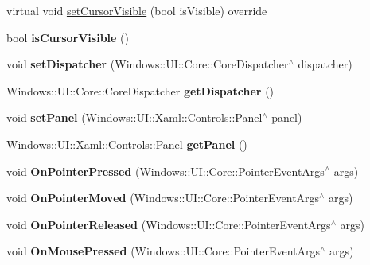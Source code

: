 \begin{DoxyCompactItemize}
virtual void \hyperlink{classGLViewImpl_a7e609efc4d34d98544b42e5f18ff29b8}{set\+Cursor\+Visible} (bool is\+Visible) override
\item 
\mbox{\label{classGLViewImpl_a522924b9888525f2cbd4929f684889f4}} 
bool {\bfseries is\+Cursor\+Visible} ()
\item 
\mbox{\label{classGLViewImpl_abeef623c7af0f597eef89c7e977df9e4}} 
void {\bfseries set\+Dispatcher} (Windows\+::\+U\+I\+::\+Core\+::\+Core\+Dispatcher$^\wedge$ dispatcher)
\item 
\mbox{\label{classGLViewImpl_a0e28b443b9abbc36e8ebfabcb7e91e63}} 
Windows\+::\+U\+I\+::\+Core\+::\+Core\+Dispatcher {\bfseries get\+Dispatcher} ()
\item 
\mbox{\label{classGLViewImpl_ad054c230517842fe38d583f34e207083}} 
void {\bfseries set\+Panel} (Windows\+::\+U\+I\+::\+Xaml\+::\+Controls\+::\+Panel$^\wedge$ panel)
\item 
\mbox{\label{classGLViewImpl_a73499a0c3442ea748c0bec971f5f2edf}} 
Windows\+::\+U\+I\+::\+Xaml\+::\+Controls\+::\+Panel {\bfseries get\+Panel} ()
\item 
\mbox{\label{classGLViewImpl_a3fcd4cc624abb75d010920e762ab9d42}} 
void {\bfseries On\+Pointer\+Pressed} (Windows\+::\+U\+I\+::\+Core\+::\+Pointer\+Event\+Args$^\wedge$ args)
\item 
\mbox{\label{classGLViewImpl_a9d19ce5d32488824616a092b30e84cc9}} 
void {\bfseries On\+Pointer\+Moved} (Windows\+::\+U\+I\+::\+Core\+::\+Pointer\+Event\+Args$^\wedge$ args)
\item 
\mbox{\label{classGLViewImpl_acd289c91947f5094a6a3e17c351c3ad6}} 
void {\bfseries On\+Pointer\+Released} (Windows\+::\+U\+I\+::\+Core\+::\+Pointer\+Event\+Args$^\wedge$ args)
\item 
\mbox{\label{classGLViewImpl_aa896a89fbb26807bca17f11cf84473ef}} 
void {\bfseries On\+Mouse\+Pressed} (Windows\+::\+U\+I\+::\+Core\+::\+Pointer\+Event\+Args$^\wedge$ args)
\item 
\mbox{\label{classGLViewImpl_a680939bfe56c0cab8c3d3a08948f5aa5}} 

\end{DoxyCompactItemize}
